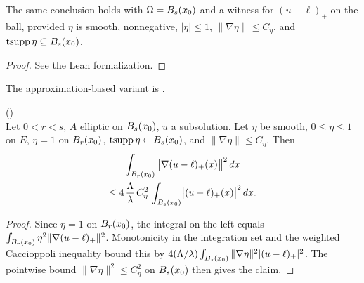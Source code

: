 \begin{theorem}
\label{thm:caccioppoli_weighted_on_ball_of_ballPosPart}
\leanok
{}
The same conclusion holds with $\Omega = B_{s}(x_0)$ and a witness
for $(u-\ell)_+$ on the ball, provided $\eta$ is smooth, nonnegative,
$|\eta| \le 1$, $\|\nabla \eta\| \le C_\eta$, and $\mathrm{tsupp}\,\eta
\subseteq B_{s}(x_0)$.
\end{theorem}

\begin{proof}
\leanok
{}
See the Lean formalization.
\end{proof}

The approximation-based variant is
.

\begin{theorem}
\label{thm:deGiorgi_energy_estimate_on_concentricBalls_of_ballPosPart}
\leanok
{}
()\\
Let $0 < r < s$, $A$ elliptic on $B_{s}(x_0)$, $u$ a subsolution.
Let $\eta$ be smooth, $0 \le \eta \le 1$ on $E$, $\eta = 1$ on
$B_{r}(x_0)$, $\mathrm{tsupp}\,\eta \subset B_{s}(x_0)$, and
$\|\nabla \eta\| \le C_\eta$. Then
\begin{multline*}
  \int_{B_{r}(x_0)} \bigl\|\nabla(u-\ell)_+(x)\bigr\|^2 \, dx \\
  \le 4\,\frac{\Lambda}{\lambda} \, C_\eta^2 \,
    \int_{B_{s}(x_0)} \bigl|(u-\ell)_+(x)\bigr|^2 \, dx.
\end{multline*}
\end{theorem}

\begin{proof}
\leanok
{}

Since $\eta = 1$ on $B_{r}(x_0)$, the integral on the left equals
$\int_{B_{r}(x_0)} \eta^2 \|\nabla(u-\ell)_+\|^2$. Monotonicity in
the integration set and the weighted Caccioppoli inequality bound
this by $4(\Lambda/\lambda)\int_{B_{s}(x_0)} \|\nabla \eta\|^2
|(u-\ell)_+|^2$. The pointwise bound $\|\nabla\eta\|^2 \le C_\eta^2$
on $B_{s}(x_0)$ then gives the claim.
\end{proof}

